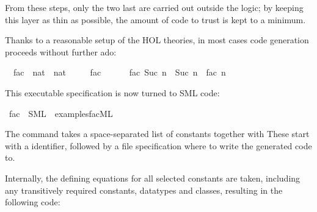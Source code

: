 \begin{isabellebody}
\begin{isamarkuptext}
  From these steps, only the two last are carried out
  outside the logic; by keeping this layer as
  thin as possible, the amount of code to trust is
  kept to a minimum.%
\end{isamarkuptext}%
\isamarkuptrue%
%
\isamarkuptrue%
%
\isamarkuptrue%
%
\begin{isamarkuptext}%
Thanks to a reasonable setup of the HOL theories, in
  most cases code generation proceeds without further ado:%
\end{isamarkuptext}%
\isamarkuptrue%
\isamarkupfalse%
\isanewline
\ \ fac\ {\isacharcolon}{\isacharcolon}\ {\isachardoublequoteopen}nat\ {\isasymRightarrow}\ nat{\isachardoublequoteclose}\ \isanewline
\ \ \ \ {\isachardoublequoteopen}fac\ {}\ {\isacharequal}\ {}{\isachardoublequoteclose}\isanewline
\ \ {\isacharbar}\ {\isachardoublequoteopen}fac\ {\isacharparenleft}Suc\ n{\isacharparenright}\ {\isacharequal}\ Suc\ n\ {\isacharasterisk}\ fac\ n{\isachardoublequoteclose}%
\begin{isamarkuptext}%
\noindent This executable specification is now turned to SML code:%
\end{isamarkuptext}%
\isamarkuptrue%
\isamarkupfalse%
\ fac\ \ SML\ \ {\isachardoublequoteopen}examples{\isacharslash}fac{\isachardot}ML{\isachardoublequoteclose}%
\begin{isamarkuptext}%
\noindent  The \isa{{\isasymCODEGEN}} command takes a space-separated list of
  constants together with 
  These start with a 
  identifier, followed by a file specification
  where to write the generated code to.

  Internally, the defining equations for all selected
  constants are taken, including any transitively required
  constants, datatypes and classes, resulting in the following
  code:



\end{isamarkuptext}
\end{isabellebody}
